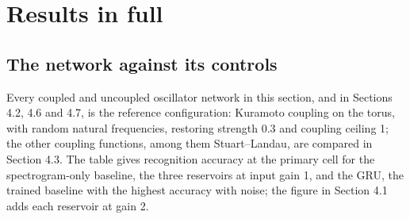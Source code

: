 \documentclass[10pt]{article}
\makeatletter
\newcommand{\tmlr@floatbarrier}{\par\vspace{\z@}%
  \ifx\@deferlist\@empty\else\clearpage\fi}
\let\tmlr@section\section
\renewcommand{\section}{\tmlr@floatbarrier\tmlr@section}
\makeatother
\begin{document}
\section{Results in full}\label{results-in-full}

\subsection{The network against its
controls}\label{the-network-against-its-controls}

Every coupled and uncoupled oscillator network in this section, and in
Sections 4.2, 4.6 and 4.7, is the reference configuration: Kuramoto
coupling on the torus, with random natural frequencies, restoring
strength 0.3 and coupling ceiling 1; the other coupling functions, among
them Stuart--Landau, are compared in Section 4.3. The table gives
recognition accuracy at the primary cell for the spectrogram-only
baseline, the three reservoirs at input gain 1, and the GRU, the trained
baseline with the highest accuracy with noise; the figure in Section 4.1
adds each reservoir at gain 2.
\end{document}
